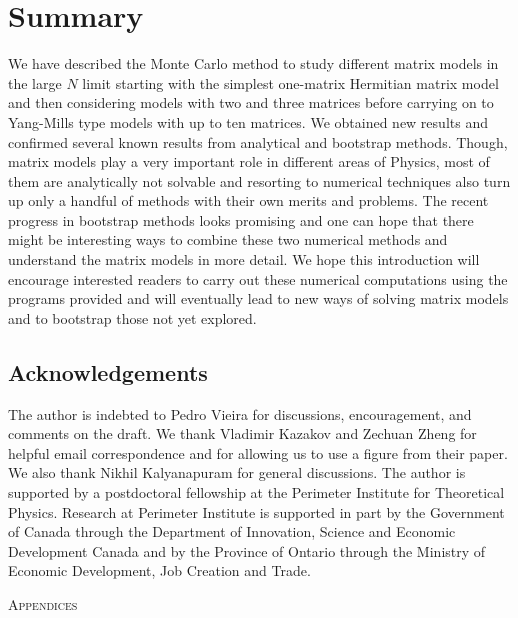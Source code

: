 \documentclass[letter,11pt]{article}
\begin{document}
\section{Summary}
We have described the Monte Carlo method to study different matrix models in the large $N$ limit starting with the simplest one-matrix Hermitian matrix model and then considering models with two and three matrices before carrying on to Yang-Mills type models with up to ten matrices. We obtained new results and confirmed several known results from analytical and bootstrap methods. Though, matrix models play a very important role in different areas of Physics, most of them are analytically not solvable and resorting to numerical techniques also turn up only a handful of methods with their own merits and problems. The recent progress in bootstrap methods looks promising and one can hope that there might be interesting ways to combine these two numerical methods and understand the matrix models in more detail. We hope this introduction will encourage interested readers to carry out these numerical computations using the programs provided and will eventually lead to new ways of solving matrix models and to bootstrap those not yet explored.
\vspace{8mm}
\subsection*{Acknowledgements}
The author is indebted to Pedro Vieira
for discussions, encouragement, and comments on the draft.
We thank Vladimir Kazakov 
and Zechuan Zheng for helpful email correspondence and for 
allowing us to use a figure from their paper. 
We also thank Nikhil Kalyanapuram for general discussions. 
The author is supported by a 
postdoctoral fellowship at the Perimeter Institute for Theoretical Physics. 
Research at Perimeter Institute is supported in part by the Government of Canada 
through the Department of Innovation, Science and Economic Development Canada 
and by the Province of Ontario through the Ministry of Economic Development, Job Creation 
and Trade. 
\vspace{6mm}
\appendix
\begin{center} \large{\textsc{Appendices}}\end{center}
\end{document}
